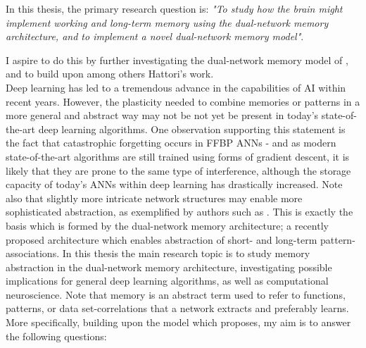 In this thesis, 
the primary research question is: \textit{"To study how the brain might implement working and long-term memory using the dual-network memory architecture, and to implement a novel dual-network memory model"}.

I aspire to do this by further investigating the dual-network memory model of \citep{Hattori2014}, and to build upon among others Hattori's work.
\\

Deep learning has led to a tremendous advance in the capabilities of AI within recent years. However, the plasticity needed to combine memories or patterns in a more general and abstract way may not be not yet be present in today's state-of-the-art deep learning algorithms. One observation supporting this statement is the fact that catastrophic forgetting occurs in FFBP ANNs - and as modern state-of-the-art algorithms are still trained using forms of gradient descent, it is likely that they are prone to the same type of interference, although the storage capacity of today's ANNs within deep learning has drastically increased. 
Note also that slightly more intricate network structures may enable more sophisticated abstraction, as exemplified by authors such as \cite{Tani2014}. This is exactly the basis which is formed by the dual-network memory architecture; a recently proposed architecture which enables abstraction of short- and long-term pattern-associations.
In this thesis the main research topic is to study memory abstraction in the dual-network memory architecture, investigating possible implications for general deep learning algorithms, as well as computational neuroscience. Note that memory is an abstract term used to refer to functions, patterns, or data set-correlations that a network extracts and preferably learns. More specifically, building upon the model which \cite{Hattori2014} proposes, my aim is to answer the following questions:
